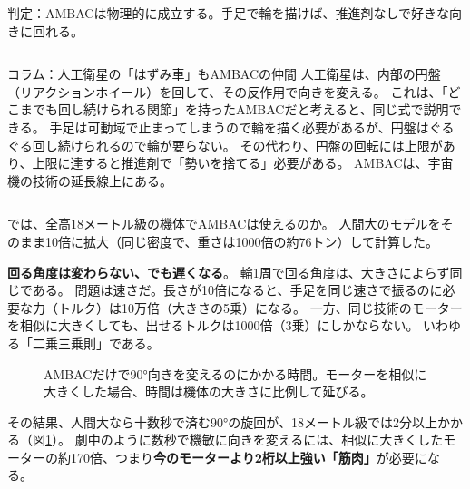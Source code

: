 \documentclass[paper=a4paper,fontsize=10pt,twocolumn,column_gap=2zw,line_length=24zw,number_of_lines=46,head_space=18mm]{jlreq}
\makeatletter
\newcounter{msec}
\renewcommand{\section}{\@ifstar{\msecstar}{\msecbox}}
\newcommand{\msecstar}[1]{\par\addvspace{0.6\baselineskip}\noindent{\bfseries\color{accent2}#1}\par\nopagebreak\vspace{0.2\baselineskip}}
\newcommand{\msecbox}[1]{\par\addvspace{0.8\baselineskip}\refstepcounter{msec}%
  \noindent\colorbox{accent2}{\parbox{\dimexpr\linewidth-2\fboxsep}{\color{white}\bfseries\large\strut\themsec\quad #1}}%
  \par\nopagebreak\vspace{0.4\baselineskip}\nopagebreak}
\makeatother
\begin{document}
\begin{verdict}
判定：AMBACは物理的に成立する。手足で輪を描けば、推進剤なしで好きな向きに回れる。
\end{verdict}

\begin{column}{コラム：人工衛星の「はずみ車」もAMBACの仲間}
人工衛星は、内部の円盤（リアクションホイール）を回して、その反作用で向きを変える。
これは、「どこまでも回し続けられる関節」を持ったAMBACだと考えると、同じ式で説明できる。
手足は可動域で止まってしまうので輪を描く必要があるが、円盤はぐるぐる回し続けられるので輪が要らない。
その代わり、円盤の回転には上限があり、上限に達すると推進剤で「勢いを捨てる」必要がある。
AMBACは、宇宙機の技術の延長線上にある。
\end{column}

\section{18メートルの壁}

では、全高18メートル級の機体でAMBACは使えるのか。
人間大のモデルをそのまま10倍に拡大（同じ密度で、重さは1000倍の約76トン）して計算した。

\textbf{回る角度は変わらない、でも遅くなる}。
輪1周で回る角度は、大きさによらず同じである。
問題は速さだ。長さが10倍になると、手足を同じ速さで振るのに必要な力（トルク）は10万倍（大きさの5乗）になる。
一方、同じ技術のモーターを相似に大きくしても、出せるトルクは1000倍（3乗）にしかならない。
いわゆる「二乗三乗則」である。

\begin{figure}[t]\centering
{}
\caption{AMBACだけで90°向きを変えるのにかかる時間。モーターを相似に大きくした場合、時間は機体の大きさに比例して延びる。}\label{fig:scale}
\end{figure}

その結果、人間大なら十数秒で済む90°の旋回が、18メートル級では2分以上かかる（図\ref{fig:scale}）。
劇中のように数秒で機敏に向きを変えるには、相似に大きくしたモーターの約170倍、つまり\textbf{今のモーターより2桁以上強い「筋肉」}が必要になる。
\end{document}
